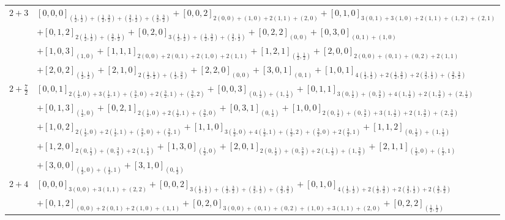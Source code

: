 \documentclass[12pt]{article}
\begin{document}
\begin{longtable}{|c|p{}|}
\hline
$2+3$ & $[0,0,0]_{(\frac{1}{2},\frac{1}{2})+(\frac{1}{2},\frac{3}{2})+(\frac{3}{2},\frac{1}{2})+(\frac{3}{2},\frac{3}{2})}+[0,0,2]_{2(0,0)+(1,0)+2(1,1)+(2,0)}+[0,1,0]_{3(0,1)+3(1,0)+2(1,1)+(1,2)+(2,1)}$ \\
& $+[0,1,2]_{2(\frac{1}{2},\frac{1}{2})+(\frac{3}{2},\frac{1}{2})}+[0,2,0]_{3(\frac{1}{2},\frac{1}{2})+(\frac{1}{2},\frac{3}{2})+(\frac{3}{2},\frac{1}{2})}+[0,2,2]_{(0,0)}+[0,3,0]_{(0,1)+(1,0)}$ \\
& $+[1,0,3]_{(1,0)}+[1,1,1]_{2(0,0)+2(0,1)+2(1,0)+2(1,1)}+[1,2,1]_{(\frac{1}{2},\frac{1}{2})}+[2,0,0]_{2(0,0)+(0,1)+(0,2)+2(1,1)}$ \\
& $+[2,0,2]_{(\frac{1}{2},\frac{1}{2})}+[2,1,0]_{2(\frac{1}{2},\frac{1}{2})+(\frac{1}{2},\frac{3}{2})}+[2,2,0]_{(0,0)}+[3,0,1]_{(0,1)}+[1,0,1]_{4(\frac{1}{2},\frac{1}{2})+2(\frac{1}{2},\frac{3}{2})+2(\frac{3}{2},\frac{1}{2})+(\frac{3}{2},\frac{3}{2})}$ \\
\hline
$2+\frac{7}{2}$ & $[0,0,1]_{2(\frac{1}{2},0)+3(\frac{1}{2},1)+(\frac{3}{2},0)+2(\frac{3}{2},1)+(\frac{3}{2},2)}+[0,0,3]_{(0,\frac{1}{2})+(1,\frac{1}{2})}+[0,1,1]_{3(0,\frac{1}{2})+(0,\frac{3}{2})+4(1,\frac{1}{2})+2(1,\frac{3}{2})+(2,\frac{1}{2})}$ \\
& $+[0,1,3]_{(\frac{1}{2},0)}+[0,2,1]_{2(\frac{1}{2},0)+2(\frac{1}{2},1)+(\frac{3}{2},0)}+[0,3,1]_{(0,\frac{1}{2})}+[1,0,0]_{2(0,\frac{1}{2})+(0,\frac{3}{2})+3(1,\frac{1}{2})+2(1,\frac{3}{2})+(2,\frac{3}{2})}$ \\
& $+[1,0,2]_{2(\frac{1}{2},0)+2(\frac{1}{2},1)+(\frac{3}{2},0)+(\frac{3}{2},1)}+[1,1,0]_{3(\frac{1}{2},0)+4(\frac{1}{2},1)+(\frac{1}{2},2)+(\frac{3}{2},0)+2(\frac{3}{2},1)}+[1,1,2]_{(0,\frac{1}{2})+(1,\frac{1}{2})}$ \\
& $+[1,2,0]_{2(0,\frac{1}{2})+(0,\frac{3}{2})+2(1,\frac{1}{2})}+[1,3,0]_{(\frac{1}{2},0)}+[2,0,1]_{2(0,\frac{1}{2})+(0,\frac{3}{2})+2(1,\frac{1}{2})+(1,\frac{3}{2})}+[2,1,1]_{(\frac{1}{2},0)+(\frac{1}{2},1)}$ \\
& $+[3,0,0]_{(\frac{1}{2},0)+(\frac{1}{2},1)}+[3,1,0]_{(0,\frac{1}{2})}$ \\
\hline
$2+4$ & $[0,0,0]_{3(0,0)+3(1,1)+(2,2)}+[0,0,2]_{3(\frac{1}{2},\frac{1}{2})+(\frac{1}{2},\frac{3}{2})+(\frac{3}{2},\frac{1}{2})+(\frac{3}{2},\frac{3}{2})}+[0,1,0]_{4(\frac{1}{2},\frac{1}{2})+2(\frac{1}{2},\frac{3}{2})+2(\frac{3}{2},\frac{1}{2})+2(\frac{3}{2},\frac{3}{2})}$ \\
& $+[0,1,2]_{(0,0)+2(0,1)+2(1,0)+(1,1)}+[0,2,0]_{3(0,0)+(0,1)+(0,2)+(1,0)+3(1,1)+(2,0)}+[0,2,2]_{(\frac{1}{2},\frac{1}{2})}$ \\

\end{longtable}
\end{document}
